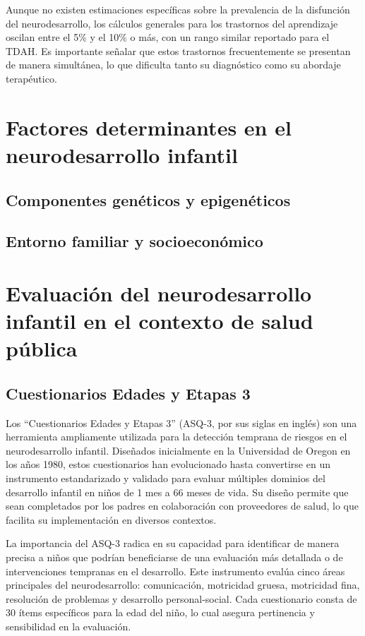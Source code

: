 Aunque no existen estimaciones específicas sobre la prevalencia de la
disfunción del neurodesarrollo, los cálculos generales para los trastornos del
aprendizaje oscilan entre el 5\% y el 10\% o más, con un rango similar
reportado para el TDAH. Es importante señalar que estos trastornos
frecuentemente se presentan de manera simultánea, lo que dificulta tanto su
diagnóstico como su abordaje terapéutico.

\section{Factores determinantes en el neurodesarrollo infantil}
\subsection{Componentes genéticos y epigenéticos}

\subsection{Entorno familiar y socioeconómico}

\section{Evaluación del neurodesarrollo infantil en el contexto de salud pública}

\subsection{Cuestionarios Edades y Etapas 3}
Los ``Cuestionarios Edades y Etapas 3'' (ASQ-3, por sus siglas en inglés) son
una herramienta ampliamente utilizada para la detección temprana de riesgos en
el neurodesarrollo infantil. Diseñados inicialmente en la Universidad de Oregon
en los años 1980, estos cuestionarios han evolucionado hasta convertirse en un
instrumento estandarizado y validado para evaluar múltiples dominios del
desarrollo infantil en niños de 1 mes a 66 meses de vida. Su diseño permite que
sean completados por los padres en colaboración con proveedores de salud, lo
que facilita su implementación en diversos contextos.
\cite{Singh2017, ASQ4decades}

La importancia del ASQ-3 radica en su capacidad para identificar de manera
precisa a niños que podrían beneficiarse de una evaluación más detallada o de
intervenciones tempranas en el desarrollo. Este instrumento evalúa cinco áreas
principales del neurodesarrollo: comunicación, motricidad gruesa, motricidad
fina, resolución de problemas y desarrollo personal-social. Cada cuestionario
consta de 30 ítems específicos para la edad del niño, lo cual asegura
pertinencia y sensibilidad en la evaluación. \cite{squires2009ages}


